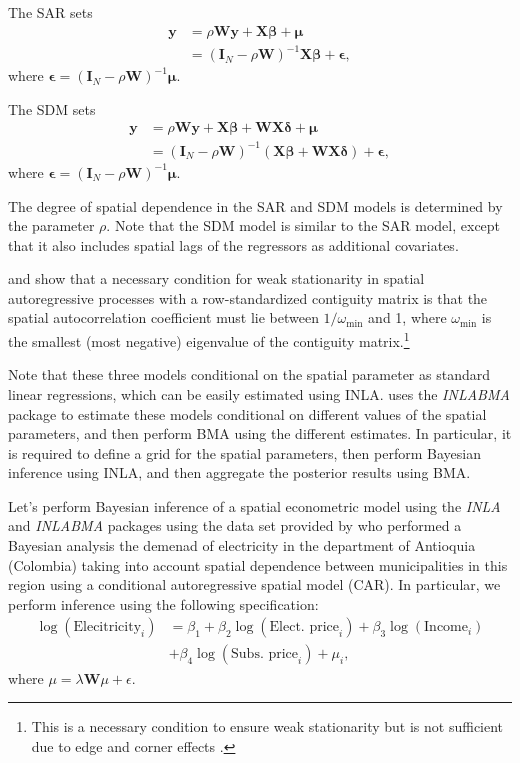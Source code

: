The SAR sets
\begin{align*}
	\boldsymbol{y} &= \rho\boldsymbol{Wy} + \boldsymbol{X\beta} + \boldsymbol{\mu}\\
	 &= (\boldsymbol{I}_N-\rho\boldsymbol{W})^{-1}\boldsymbol{X\beta} + \boldsymbol{\epsilon},
\end{align*}
where $\boldsymbol{\epsilon}=(\boldsymbol{I}_N-\rho\boldsymbol{W})^{-1}\boldsymbol{\mu}$.

The SDM sets
\begin{align*}
	\boldsymbol{y} &= \rho\boldsymbol{Wy} + \boldsymbol{X\beta} +  \boldsymbol{WX\delta} + \boldsymbol{\mu}\\
	&= (\boldsymbol{I}_N-\rho\boldsymbol{W})^{-1}(\boldsymbol{X\beta} +  \boldsymbol{WX\delta}) + \boldsymbol{\epsilon},
\end{align*}
where $\boldsymbol{\epsilon}=(\boldsymbol{I}_N-\rho\boldsymbol{W})^{-1}\boldsymbol{\mu}$.

The degree of spatial dependence in the SAR and SDM models is determined by the parameter \( \rho \). Note that the SDM model is similar to the SAR model, except that it also includes spatial lags of the regressors as additional covariates.

\cite{ord75} and \cite{anselin82} show that a necessary condition for weak stationarity in spatial autoregressive processes with a row-standardized contiguity matrix is that the spatial autocorrelation coefficient must lie between \( 1/\omega_{\min} \) and 1, where \( \omega_{\min} \) is the smallest (most negative) eigenvalue of the contiguity matrix.\footnote{This is a necessary condition to ensure weak stationarity but is not sufficient due to edge and corner effects \cite[]{haining90}.}

Note that these three models conditional on the spatial parameter as standard linear regressions, which can be easily estimated using INLA. \cite{bivand2015spatial} uses the \textit{INLABMA} package to estimate these models conditional on different values of the spatial parameters, and then perform BMA using the different estimates. In particular, it is required to define a grid for the spatial parameters, then perform Bayesian inference using INLA, and then aggregate the posterior results using BMA.

Let's perform Bayesian inference of a spatial econometric model using the \textit{INLA} and \textit{INLABMA} packages using the data set provided by \cite{ramirez2019welfare} who performed a Bayesian analysis the demenad of electricity in the department of Antioquia (Colombia) taking into account spatial dependence between municipalities in this region using a conditional autoregressive spatial model (CAR). In particular, we perform inference using the following specification:
\begin{align*}
	\log(\text{Elecitricity}_i)&=\beta_1+\beta_2\log(\text{Elect. price}_i)+\beta_3\log(\text{Income}_i)\\
	&+\beta_4\log(\text{Subs. price}_i)+\mu_i,
\end{align*} 
where $\mu=\lambda\boldsymbol{W}\mu+\epsilon$.  

